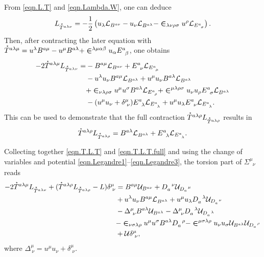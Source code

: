 \documentclass[
10pt, %
a4paper, %
oneside, %
headinclude,footinclude, %
BCOR5mm, %
]{scrartcl}
\newcommand{\ET}[2]{E^{#1}_{\phantom{#1}#2}}	%
\newcommand{\dT}[2]{D_{#1}^{\phantom{#1}\,#2}}	%
\newcommand{\BT}[2]{B^{#1#2}}	%
\newcommand{\bT}[2]{B^{#1#2}}	%
\newcommand{\Laghodge}{L}%
\newcommand{\LagBE}{\mathcal{L}}%
\newcommand{\LagST}{\mathcal{U}}%
\newcommand{\EM}[2]{\Sigma^{#1}_{\phantom{#1}#2}}
\newcommand{\LCsymb}{\bm{\in}}    %
\newcommand{\HDT}[1]{\accentset{\star}{T}^{#1}}
\newcommand{\KD}[2]{\delta^{#1}_{\,\,#2}}
\newcommand{\projector}[2]{\Delta^{#1}_{\ #2}}
\begin{document}
From \eqref{eqn.L.T} and \eqref{eqn.Lambda.W}, one can deduce 
\begin{equation}
	\Laghodge_{\HDT{a\lambda\nu}} = -\frac{1}{2} 
	\left(
	u_\lambda \LagBE_{\BT{a}{\nu}} - u_\nu \LagBE_{\BT{a}{\lambda}} 
	-
	\LCsymb_{\lambda\nu\rho\sigma} u^\rho \LagBE_{\ET{a}{\sigma}} 
	\right).
\end{equation}
Then, after contracting the later equation with $ \HDT{a\lambda\mu} = u^\lambda \BT{a}{\mu} - u^\mu 
\BT{a}{\lambda} + \LCsymb^{\lambda\mu\alpha\beta} u_\alpha \ET{a}{\beta} $, one obtains
 \begin{align}\label{eqn.T.L.T} 
 	-2 \HDT{a\lambda\mu} \Laghodge_{\HDT{a\lambda\nu}} =
 	& -\BT{a}{\mu}\LagBE_{\BT{a}{\nu}} + \ET{a}{\nu}\LagBE_{\ET{a}{\mu}} \\
 	& - u^\lambda u_\nu \BT{a}{\mu} \LagBE_{\BT{a}{\lambda}} + u^\mu u_\nu \BT{a}{\lambda} 
 	\LagBE_{\BT{a}{\lambda}}				\nonumber\\
 	& + \LCsymb_{\nu\lambda\rho\sigma} u^\mu u^\sigma \BT{a}{\lambda} \LagBE_{\ET{a}{\rho}} 
 	  + \LCsymb^{\mu\lambda\rho\sigma} u_\nu u_\rho \ET{a}{\sigma} \LagBE_{\BT{a}{\lambda}}
 	\nonumber \\
 	& - (u^\mu u_\nu + \KD{\mu}{\nu}) \ET{a}{\lambda} \LagBE_{\ET{a}{\lambda}} + u^\mu u_\lambda 
 	\ET{a}{\nu} \LagBE_{\ET{a}{\lambda}}.
 	\nonumber
 \end{align}
This can be used to demonstrate that the full contraction  $ 	\HDT{a\lambda\rho} 
\Laghodge_{\HDT{a\lambda\rho}} $ results in
\begin{equation}\label{eqn.T.L.T.full}
	\HDT{a\lambda\rho} \Laghodge_{\HDT{a\lambda\rho}}
	=
	\BT{a}{\lambda} \LagBE_{\BT{a}{\lambda}} + \ET{a}{\lambda} \LagBE_{\ET{a}{\lambda}}.
\end{equation}

Collecting together \eqref{eqn.T.L.T} and \eqref{eqn.T.L.T.full} and using the change of 
variables and potential \eqref{eqn.Legandre1}--\eqref{eqn.Legandre3}, the torsion part of $ 
\EM{\mu}{\nu} $ reads
\begin{align}\label{eqn.Sigma.tors.part}
	- 2 \HDT{a\lambda\mu}L_{\HDT{a\lambda\nu}} + 
	(\HDT{a\lambda\rho}L_{\HDT{a\lambda\rho}} - L) \KD{\mu}{\nu} 
	& = \bT{a}{\mu}\LagST_{\bT{a}{\nu}} + \dT{a}{\nu}\LagST_{\dT{a}{\mu}} \\
	& + u^\lambda u_\nu \bT{a}{\mu} \LagBE_{\bT{a}{\lambda}} + u^\mu u_\lambda \dT{a}{\lambda} 
		\LagST_{\dT{a}{\nu}}				\nonumber\\
	& - \projector{\mu}{\nu} \bT{a}{\lambda} \LagST_{\bT{a}{\lambda}} 
	  - \projector{\mu}{\nu} \dT{a}{\lambda} \LagST_{\dT{a}{\lambda}}
	  \nonumber \\
	& - \LCsymb_{\nu\sigma\lambda\rho} u^\mu u^\sigma \bT{a}{\lambda} \dT{a}{\rho} 
	  - \LCsymb^{\mu\sigma\lambda\rho} u_\nu u_\sigma \LagST_{\bT{a}{\lambda}} \LagST_{\dT{a}{\rho}} 
	  \nonumber \\
	& + \LagST \KD{\mu}{\nu}, \nonumber
\end{align}
where $ \projector{\mu}{\nu} = u^\mu u_\nu + \KD{\mu}{\nu} $.
\end{document}
